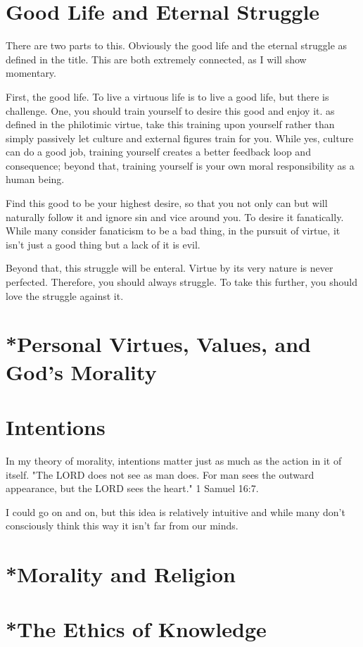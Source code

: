 \section{Good Life and Eternal Struggle}
\par There are two parts to this. Obviously the good life and the eternal struggle as defined in the title. This are both extremely connected, as I will show momentary.
\par First, the good life. To live a virtuous life is to live a good life, but there is challenge. One, you should train yourself to desire this good and enjoy it. as defined in the philotimic virtue, take this training upon yourself rather than simply passively let culture and external figures train for you. While yes, culture can do a good job, training yourself creates a better feedback loop and consequence; beyond that, training yourself is your own moral responsibility as a human being. 
\par Find this good to be your highest desire, so that you not only can but will naturally follow it and ignore sin and vice around you. To desire it fanatically. While many consider fanaticism to be a bad thing, in the pursuit of virtue, it isn't just a good thing but a lack of it is evil. 
\par Beyond that, this struggle will be enteral. Virtue by its very nature is never perfected. Therefore, you should always struggle. To take this further, you should love the struggle against it.
\section{*Personal Virtues, Values, and God's Morality}

\section{Intentions}
\par In my theory of morality, intentions matter just as much as the action in it of itself. "The LORD does not see as man does. For man sees the outward appearance, but the LORD sees the heart." 1 Samuel 16:7.
\par I could go on and on, but this idea is relatively intuitive and while many don't consciously think this way it isn't far from our minds.
\section{*Morality and Religion}
\section{*The Ethics of Knowledge}

